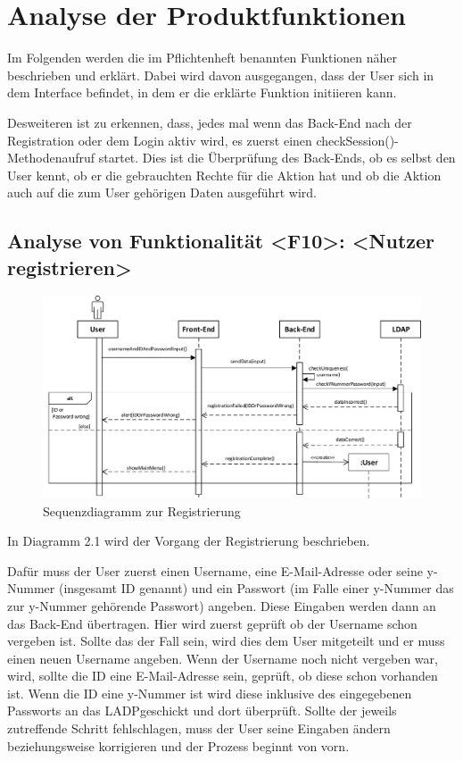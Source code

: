 
\chapter{Analyse der Produktfunktionen}\label{chap:analyse}
Im Folgenden werden die im Pflichtenheft benannten Funktionen näher beschrieben und erkl\"art. Dabei wird davon ausgegangen, dass der User sich in dem Interface befindet, in dem er die erklärte Funktion initiieren kann.

Desweiteren ist zu erkennen, dass, jedes mal wenn das Back-End nach der Registration oder dem Login aktiv wird, es zuerst einen \glqq checkSession()\grqq -Methodenaufruf startet. Dies ist die Überprüfung des Back-Ends, ob es selbst den User kennt, ob er die gebrauchten Rechte für die Aktion hat und ob die Aktion auch auf die zum User gehörigen Daten ausgeführt wird.

\newpage
\section{Analyse von Funktionalität <F10>: <Nutzer registrieren>}
\begin{figure}[htb]
\includegraphics[width=1.3\textwidth]{figures/sequenz_F10.pdf}
\caption{Sequenzdiagramm zur Registrierung}
\label{sequence}
\end{figure}


\newpage
In Diagramm 2.1 wird der Vorgang der Registrierung beschrieben.

Dafür muss der User zuerst einen Username, eine E-Mail-Adresse oder seine y-Nummer (insgesamt ID genannt) und ein Passwort (im Falle einer y-Nummer das zur y-Nummer gehörende Passwort) angeben. Diese Eingaben werden dann an das Back-End übertragen. Hier wird zuerst geprüft ob der Username schon vergeben ist. Sollte das der Fall sein, wird dies dem User mitgeteilt und er muss einen neuen Username angeben.
Wenn der Username noch nicht vergeben war, wird, sollte die ID eine E-Mail-Adresse sein, geprüft, ob diese schon vorhanden ist. Wenn die ID eine y-Nummer ist wird diese inklusive des eingegebenen Passworts an das \glqq LADP\grqq geschickt und dort überprüft. Sollte der jeweils zutreffende Schritt fehlschlagen, muss der User seine Eingaben ändern beziehungsweise korrigieren und der Prozess beginnt von vorn.

